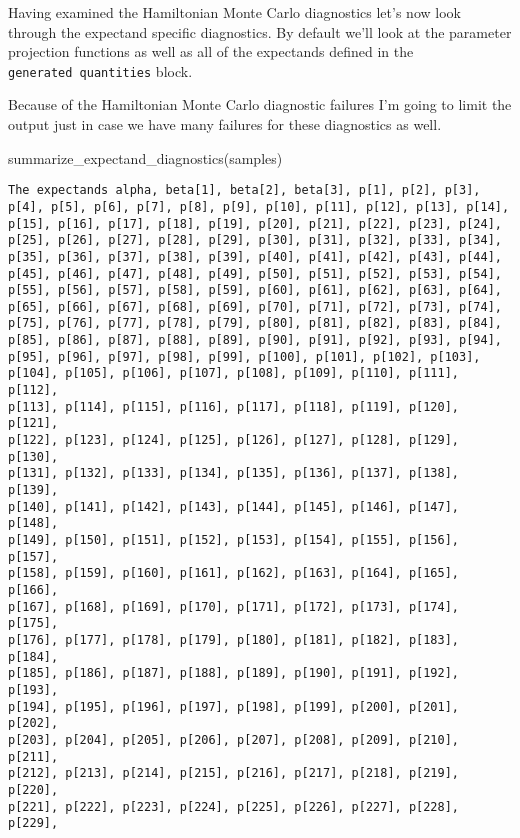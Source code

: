 \documentclass[
  letterpaper,
  DIV=11,
  numbers=noendperiod]{scrartcl}
\newenvironment{Shaded}{\begin{snugshade}}{\end{snugshade}}
\newcommand{\FunctionTok}[1]{\textcolor[rgb]{0.28,0.35,0.67}{#1}}
\newcommand{\NormalTok}[1]{\textcolor[rgb]{0.00,0.23,0.31}{#1}}
\begin{document}
Having examined the Hamiltonian Monte Carlo diagnostics let's now look
through the expectand specific diagnostics. By default we'll look at the
parameter projection functions as well as all of the expectands defined
in the \texttt{generated\ quantities} block.

Because of the Hamiltonian Monte Carlo diagnostic failures I'm going to
limit the output just in case we have many failures for these
diagnostics as well.

\begin{Shaded}
\begin{Highlighting}[]
\FunctionTok{summarize\_expectand\_diagnostics}\NormalTok{(samples)}
\end{Highlighting}
\end{Shaded}

\begin{verbatim}
The expectands alpha, beta[1], beta[2], beta[3], p[1], p[2], p[3],
p[4], p[5], p[6], p[7], p[8], p[9], p[10], p[11], p[12], p[13], p[14],
p[15], p[16], p[17], p[18], p[19], p[20], p[21], p[22], p[23], p[24],
p[25], p[26], p[27], p[28], p[29], p[30], p[31], p[32], p[33], p[34],
p[35], p[36], p[37], p[38], p[39], p[40], p[41], p[42], p[43], p[44],
p[45], p[46], p[47], p[48], p[49], p[50], p[51], p[52], p[53], p[54],
p[55], p[56], p[57], p[58], p[59], p[60], p[61], p[62], p[63], p[64],
p[65], p[66], p[67], p[68], p[69], p[70], p[71], p[72], p[73], p[74],
p[75], p[76], p[77], p[78], p[79], p[80], p[81], p[82], p[83], p[84],
p[85], p[86], p[87], p[88], p[89], p[90], p[91], p[92], p[93], p[94],
p[95], p[96], p[97], p[98], p[99], p[100], p[101], p[102], p[103],
p[104], p[105], p[106], p[107], p[108], p[109], p[110], p[111], p[112],
p[113], p[114], p[115], p[116], p[117], p[118], p[119], p[120], p[121],
p[122], p[123], p[124], p[125], p[126], p[127], p[128], p[129], p[130],
p[131], p[132], p[133], p[134], p[135], p[136], p[137], p[138], p[139],
p[140], p[141], p[142], p[143], p[144], p[145], p[146], p[147], p[148],
p[149], p[150], p[151], p[152], p[153], p[154], p[155], p[156], p[157],
p[158], p[159], p[160], p[161], p[162], p[163], p[164], p[165], p[166],
p[167], p[168], p[169], p[170], p[171], p[172], p[173], p[174], p[175],
p[176], p[177], p[178], p[179], p[180], p[181], p[182], p[183], p[184],
p[185], p[186], p[187], p[188], p[189], p[190], p[191], p[192], p[193],
p[194], p[195], p[196], p[197], p[198], p[199], p[200], p[201], p[202],
p[203], p[204], p[205], p[206], p[207], p[208], p[209], p[210], p[211],
p[212], p[213], p[214], p[215], p[216], p[217], p[218], p[219], p[220],
p[221], p[222], p[223], p[224], p[225], p[226], p[227], p[228], p[229],

\end{verbatim}
\end{document}
